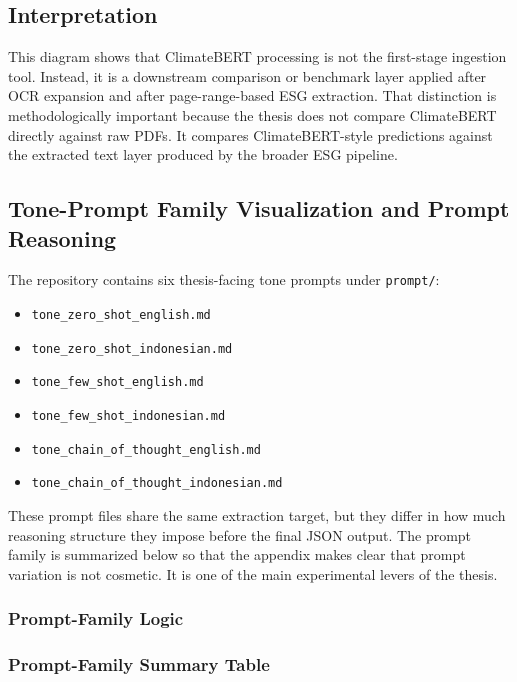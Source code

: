 \documentclass[english, online, cse, master]{dithesis}
\providecommand{\tightlist}{\setlength{\itemsep}{0pt}\setlength{\parskip}{0pt}}
\begin{document}
\subsection{Interpretation}\label{interpretation}

This diagram shows that ClimateBERT processing is not the first-stage ingestion tool. Instead, it is a downstream comparison or benchmark layer applied after OCR expansion and after page-range-based ESG extraction. That distinction is methodologically important because the thesis does not compare ClimateBERT directly against raw PDFs. It compares ClimateBERT-style predictions against the extracted text layer produced by the broader ESG pipeline.

\subsection{Tone-Prompt Family Visualization and Prompt Reasoning}\label{tone-prompt-family-visualization-and-prompt-reasoning}

The repository contains six thesis-facing tone prompts under \texttt{prompt/}:

\begin{itemize}
\tightlist
\item
  \texttt{tone\_zero\_shot\_english.md}
\item
  \texttt{tone\_zero\_shot\_indonesian.md}
\item
  \texttt{tone\_few\_shot\_english.md}
\item
  \texttt{tone\_few\_shot\_indonesian.md}
\item
  \texttt{tone\_chain\_of\_thought\_english.md}
\item
  \texttt{tone\_chain\_of\_thought\_indonesian.md}
\end{itemize}

These prompt files share the same extraction target, but they differ in how much reasoning structure they impose before the final JSON output. The prompt family is summarized below so that the appendix makes clear that prompt variation is not cosmetic. It is one of the main experimental levers of the thesis.

\subsubsection{Prompt-Family Logic}\label{prompt-family-logic}



\subsubsection{Prompt-Family Summary Table}\label{prompt-family-summary-table}
\end{document}
